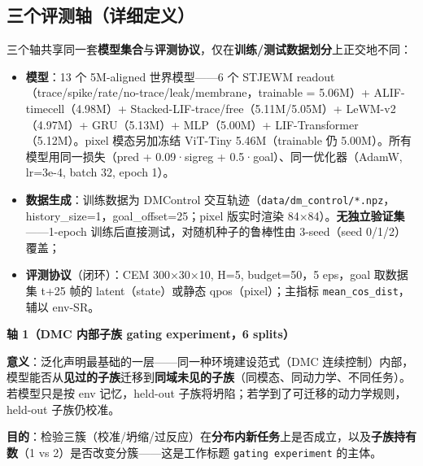 \documentclass[11pt,a4paper]{article}
\begin{document}
\subsection{三个评测轴（详细定义）}

三个轴共享同一套\textbf{模型集合}与\textbf{评测协议}，仅在\textbf{训练/测试数据划分}上正交地不同：

\begin{itemize}[leftmargin=2em]
    \item \textbf{模型}：13 个 5M-aligned 世界模型——6 个 STJEWM readout（trace/spike/rate/no-trace/leak/membrane，trainable = 5.06M）+ ALIF-timecell（4.98M）+ Stacked-LIF-trace/free（5.11M/5.05M）+ LeWM-v2（4.97M）+ GRU（5.13M）+ MLP（5.00M）+ LIF-Transformer（5.12M）。pixel 模态另加冻结 ViT-Tiny 5.46M（trainable 仍 5.00M）。所有模型用同一损失（pred + 0.09·sigreg + 0.5·goal）、同一优化器（AdamW, lr=3e-4, batch 32, epoch 1）。
    \item \textbf{数据生成}：训练数据为 DMControl 交互轨迹（\texttt{data/dm\_control/*.npz}，history\_size=1，goal\_offset=25；pixel 版实时渲染 84×84）。\textbf{无独立验证集}——1-epoch 训练后直接测试，对随机种子的鲁棒性由 3-seed（seed 0/1/2）覆盖；
    \item \textbf{评测协议}（闭环）：CEM 300×30×10, H=5, budget=50，5 eps，goal 取数据集 t+25 帧的 latent（state）或静态 qpos（pixel）；主指标 \texttt{mean\_cos\_dist}，辅以 env-SR。
\end{itemize}

\textbf{轴 1（DMC 内部子族 gating experiment，6 splits）}

\textbf{意义}：泛化声明最基础的一层——同一种环境建设范式（DMC 连续控制）内部，模型能否从\textbf{见过的子族}迁移到\textbf{同域未见的子族}（同模态、同动力学、不同任务）。若模型只是按 env 记忆，held-out 子族将坍陷；若学到了可迁移的动力学规则，held-out 子族仍校准。

\textbf{目的}：检验三簇（校准/坍缩/过反应）在\textbf{分布内新任务}上是否成立，以及\textbf{子族持有数}（1 vs 2）是否改变分簇——这是工作标题 \texttt{gating experiment} 的主体。
\end{document}
